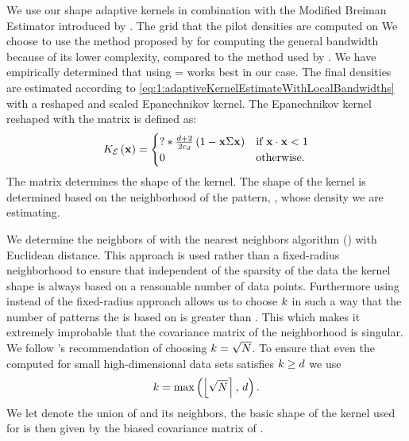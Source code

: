 
	We use our shape adaptive kernels in combination with the Modified Breiman Estimator introduced by \textcite{wilkinson1995dataplot}.
	The grid that the pilot densities are computed on  
	We choose to use the method proposed by \textcite{ferdosi2011comparison} for computing the general bandwidth because of its lower complexity, compared to the method used by \textcite{wilkinson1995dataplot}. 
	We have empirically determined  that using \varMBESensitivityParam =  works best in our case. 
	The final densities are estimated according to \cref{eq:1:adaptiveKernelEstimateWithLocalBandwidths} with a reshaped and scaled Epanechnikov kernel. The Epanechnikov kernel reshaped with the matrix \varCovarianceMatrix is defined as:
	\begin{equation}\label{eq:1:epanechnikovKernelWithCovarianceMatrix}
		\varKernel[\varEpan]{\varPattern} = 
		\begin{cases}
			? * \frac{\varDim + 2}{2\varUnitSphere{\varDim}} \left( 1 - \varPattern \varCovarianceMatrix \varPattern \right) & \text{if } \varPattern \cdot \varPattern < 1\\
			0 & \text{otherwise.}
		\end{cases}
	\end{equation}
	The matrix \varCovarianceMatrix determines the shape of the kernel. The shape of the kernel is determined based on the neighborhood of the pattern, \varPattern, whose density we are estimating. 


	We determine the neighbors of \varPattern with the \KNNK nearest neighbors algorithm (\KNN) with Euclidean distance. This approach is used rather than a fixed-radius neighborhood to ensure that independent of the sparsity of the data the kernel shape is always based on a reasonable number of data points. 
	Furthermore using \KNN instead of the fixed-radius approach allows us to choose $k$ in such a way that the number of patterns the \varCovarianceMatrix is based on is greater than \varDim. This which makes it extremely improbable that the covariance matrix of the neighborhood is singular. We follow \citeauthor{silverman1986density}'s \cite{silverman1986density} recommendation of choosing $k = \sqrt{N}$. To ensure that even the \KNNK computed for small high-dimensional data sets satisfies $k \geq d$ we use
	\begin{equation*}
	k = \max\left(\left\lfloor \sqrt{N} \right\rceil,\, d \right).	
	\end{equation*}
	We let \varNeighborhood{\varPattern} denote the union of \varPattern and its \KNNK neighbors, the basic shape of the kernel used for \varPattern is then given by the biased covariance matrix of \varNeighborhood{\varPattern}.

